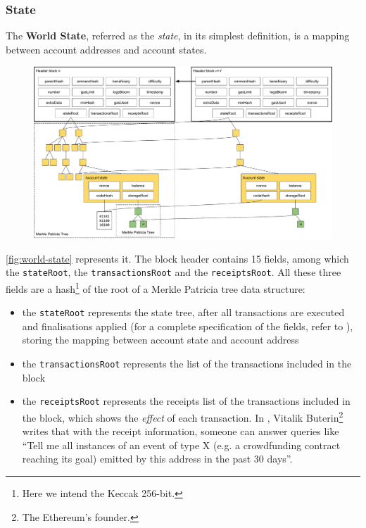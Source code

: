 \subsubsection{State}
\label{sec:world-state}

The \textbf{World State}, referred as the \emph{state}, in its simplest
definition, is a mapping between account addresses and account states.

\begin{figure}[h]
  \centering
  \includegraphics[width=\textwidth]{./res/img/world-state.pdf}
\label{fig:world-state}
\end{figure}

\autoref{fig:world-state} represents it. The block header contains 15 fields,
among which the \verb+stateRoot+, the \verb+transactionsRoot+ and the
\verb+receiptsRoot+. All these three fields are a hash\footnote{Here we intend
the Keccak 256-bit.} of the root of a Merkle Patricia tree data structure:

\begin{itemize}
  \item the \verb+stateRoot+ represents the state tree, after all transactions
  are executed and finalisations applied (for a complete specification of the
  fields, refer to \cite{wood2018ethereum}), storing the mapping between account
  state and account address
  \item the \verb+transactionsRoot+ represents the list of the transactions included in
  the block
  \item the \verb+receiptsRoot+ represents the receipts list of the transactions
  included in the block, which shows the \emph{effect} of each transaction. In
  \cite{merklingethereum}, Vitalik Buterin\footnote{The Ethereum's founder.}
  writes that with the receipt information, someone can answer queries like
  ``Tell me all instances of an event of type X (e.g. a crowdfunding contract
  reaching its goal) emitted by this address in the past 30 days''.
\end{itemize}

